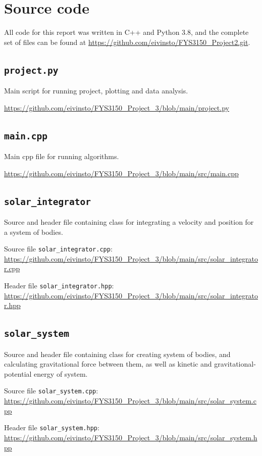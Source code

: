 \documentclass[reprint,english,notitlepage]{revtex4-1}  %
\begin{document}
\appendix
\section{Source code} \label{A}
All code for this report was written in C++ and Python 3.8, and the complete set of files can be found at
\url{https://github.com/eivinsto/FYS3150_Project2.git}.

\cprotect\subsection{\verb+project.py+} \label{A.1}
Main script for running project, plotting and data analysis.

\url{https://github.com/eivinsto/FYS3150_Project_3/blob/main/project.py}

\cprotect\subsection{\verb+main.cpp+} \label{A.2}
Main cpp file for running algorithms.

\url{https://github.com/eivinsto/FYS3150_Project_3/blob/main/src/main.cpp}

\cprotect\subsection{\verb+solar_integrator+} \label{A.3}
Source and header file containing class for integrating a velocity and position for a system of bodies.

Source file \verb+solar_integrator.cpp+:
\url{https://github.com/eivinsto/FYS3150_Project_3/blob/main/src/solar_integrator.cpp}

Header file \verb+solar_integrator.hpp+:
\url{https://github.com/eivinsto/FYS3150_Project_3/blob/main/src/solar_integrator.hpp}

\cprotect\subsection{\verb+solar_system+} \label{A.4}
Source and header file containing class for creating system of bodies, and calculating gravitational force between them, as well as kinetic and gravitational-potential energy of system.

Source file \verb+solar_system.cpp+:
\url{https://github.com/eivinsto/FYS3150_Project_3/blob/main/src/solar_system.cpp}

Header file \verb+solar_system.hpp+:
\url{https://github.com/eivinsto/FYS3150_Project_3/blob/main/src/solar_system.hpp}
\end{document}
